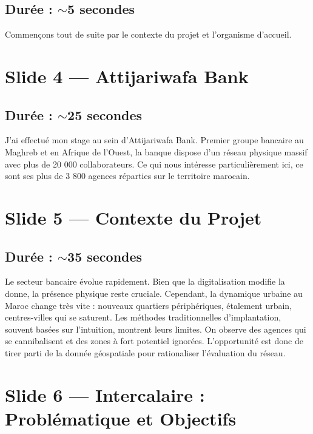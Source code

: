 \documentclass[11pt,a4paper]{article}
\begin{document}
\subsection{Durée : $\sim$5 secondes}
Commençons tout de suite par le contexte du projet et l'organisme d'accueil.

\section{Slide 4 --- Attijariwafa Bank}
\subsection{Durée : $\sim$25 secondes}
J'ai effectué mon stage au sein d'Attijariwafa Bank. Premier groupe bancaire au Maghreb et en Afrique de l'Ouest, la banque dispose d'un réseau physique massif avec plus de 20 000 collaborateurs. Ce qui nous intéresse particulièrement ici, ce sont ses plus de 3 800 agences réparties sur le territoire marocain.

\section{Slide 5 --- Contexte du Projet}
\subsection{Durée : $\sim$35 secondes}
Le secteur bancaire évolue rapidement. Bien que la digitalisation modifie la donne, la présence physique reste cruciale. Cependant, la dynamique urbaine au Maroc change très vite : nouveaux quartiers périphériques, étalement urbain, centres-villes qui se saturent. Les méthodes traditionnelles d'implantation, souvent basées sur l'intuition, montrent leurs limites. On observe des agences qui se cannibalisent et des zones à fort potentiel ignorées. L'opportunité est donc de tirer parti de la donnée géospatiale pour rationaliser l'évaluation du réseau.

\section{Slide 6 --- Intercalaire : Problématique et Objectifs}
\end{document}
